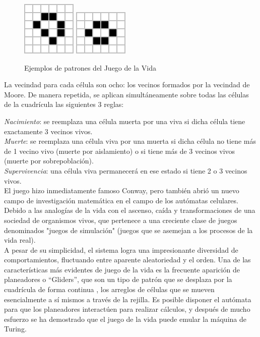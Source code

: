 \begin{figure}[H]
\centering
\includegraphics[scale=0.6]{imagenes/life_1.png}
\hspace{2cm}
\includegraphics[scale=0.6]{imagenes/life_2.png}
\caption{Ejemplos de patrones del Juego de la Vida}
\label{fig:patrones}
\end{figure}


La vecindad para cada célula son ocho: los vecinos formados por la vecindad de  Moore. De manera repetida, se aplican simultáneamente sobre todas las células de la cuadrícula las siguientes 3 reglas:

\textit{Nacimiento}: se reemplaza una célula muerta por una viva si dicha célula tiene exactamente 3 vecinos vivos.\\
\textit{Muerte}: se reemplaza una célula viva por una muerta si dicha célula no tiene más de 1 vecino vivo (muerte por aislamiento) o si tiene más de 3 vecinos vivos (muerte por sobrepoblación).\\
\textit{Supervivencia}: una célula viva permanecerá en ese estado si tiene 2 o 3 vecinos vivos.\\

El juego hizo inmediatamente famoso Conway, pero también abrió un nuevo campo de investigación matemática en el campo de los autómatas celulares. Debido a las analogías de la vida con el ascenso, caída y transformaciones de una sociedad de organismos vivos, que pertenece a una creciente clase de juegos denominados "juegos de simulación" (juegos que se asemejan a los procesos de la vida real).\\

A pesar de su simplicidad, el sistema logra una impresionante diversidad de comportamientos, fluctuando entre aparente aleatoriedad y el orden. Una de las características más evidentes de juego de la vida es la frecuente aparición de planeadores o ``Gliders'', que son un tipo de patrón que se desplaza por la cuadrícula de forma continua , los arreglos de células que se mueven esencialmente a sí mismos a través de la rejilla. Es posible disponer el autómata para que los planeadores interactúen para realizar cálculos, y después de mucho esfuerzo se ha demostrado que el juego de la vida puede emular  la máquina de Turing.

